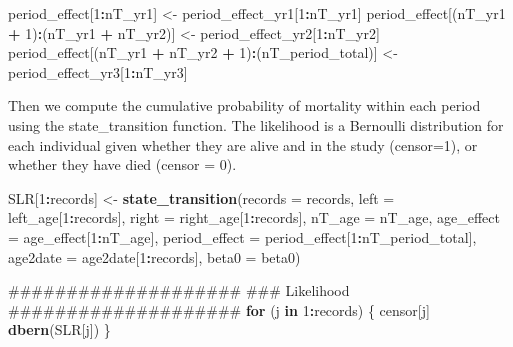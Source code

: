 \documentclass[11pt,]{article}
\newenvironment{Shaded}{\begin{snugshade}}{\end{snugshade}}
\newcommand{\KeywordTok}[1]{\textcolor[rgb]{0.13,0.29,0.53}{\textbf{#1}}}
\newcommand{\DataTypeTok}[1]{\textcolor[rgb]{0.13,0.29,0.53}{#1}}
\newcommand{\DecValTok}[1]{\textcolor[rgb]{0.00,0.00,0.81}{#1}}
\newcommand{\StringTok}[1]{\textcolor[rgb]{0.31,0.60,0.02}{#1}}
\newcommand{\ControlFlowTok}[1]{\textcolor[rgb]{0.13,0.29,0.53}{\textbf{#1}}}
\newcommand{\OperatorTok}[1]{\textcolor[rgb]{0.81,0.36,0.00}{\textbf{#1}}}
\newcommand{\NormalTok}[1]{#1}
\begin{document}
\begin{Shaded}
\begin{Highlighting}[]
\NormalTok{  period_effect[}\DecValTok{1}\OperatorTok{:}\NormalTok{nT_yr1] <-}\StringTok{ }\NormalTok{period_effect_yr1[}\DecValTok{1}\OperatorTok{:}\NormalTok{nT_yr1]}
\NormalTok{  period_effect[(nT_yr1 }\OperatorTok{+}\StringTok{ }\DecValTok{1}\NormalTok{)}\OperatorTok{:}\NormalTok{(nT_yr1 }\OperatorTok{+}\StringTok{ }\NormalTok{nT_yr2)] <-}\StringTok{ }\NormalTok{period_effect_yr2[}\DecValTok{1}\OperatorTok{:}\NormalTok{nT_yr2]}
\NormalTok{  period_effect[(nT_yr1 }\OperatorTok{+}\StringTok{ }\NormalTok{nT_yr2 }\OperatorTok{+}\StringTok{ }\DecValTok{1}\NormalTok{)}\OperatorTok{:}\NormalTok{(nT_period_total)] <-}\StringTok{ }\NormalTok{period_effect_yr3[}\DecValTok{1}\OperatorTok{:}\NormalTok{nT_yr3]}
\end{Highlighting}
\end{Shaded}

Then we compute the cumulative probability of mortality within each
period using the state\_transition function. The likelihood is a
Bernoulli distribution for each individual given whether they are alive
and in the study (censor=1), or whether they have died (censor = 0).

\begin{Shaded}
\begin{Highlighting}[]
\NormalTok{  SLR[}\DecValTok{1}\OperatorTok{:}\NormalTok{records] <-}\StringTok{ }\KeywordTok{state_transition}\NormalTok{(}\DataTypeTok{records =}\NormalTok{ records,}
                                   \DataTypeTok{left =}\NormalTok{ left_age[}\DecValTok{1}\OperatorTok{:}\NormalTok{records],}
                                   \DataTypeTok{right =}\NormalTok{ right_age[}\DecValTok{1}\OperatorTok{:}\NormalTok{records],}
                                   \DataTypeTok{nT_age =}\NormalTok{ nT_age,}
                                   \DataTypeTok{age_effect =}\NormalTok{ age_effect[}\DecValTok{1}\OperatorTok{:}\NormalTok{nT_age],}
                                   \DataTypeTok{period_effect =}\NormalTok{ period_effect[}\DecValTok{1}\OperatorTok{:}\NormalTok{nT_period_total],}
                                   \DataTypeTok{age2date =}\NormalTok{ age2date[}\DecValTok{1}\OperatorTok{:}\NormalTok{records],}
                                   \DataTypeTok{beta0 =}\NormalTok{ beta0)}

\NormalTok{  ####################}
\NormalTok{  ### Likelihood}
\NormalTok{  ####################}
  \ControlFlowTok{for}\NormalTok{ (j }\ControlFlowTok{in} \DecValTok{1}\OperatorTok{:}\NormalTok{records) \{}
\NormalTok{    censor[j] }\OperatorTok{~}\StringTok{ }\KeywordTok{dbern}\NormalTok{(SLR[j])}
\NormalTok{  \}}
\end{Highlighting}
\end{Shaded}
\end{document}
